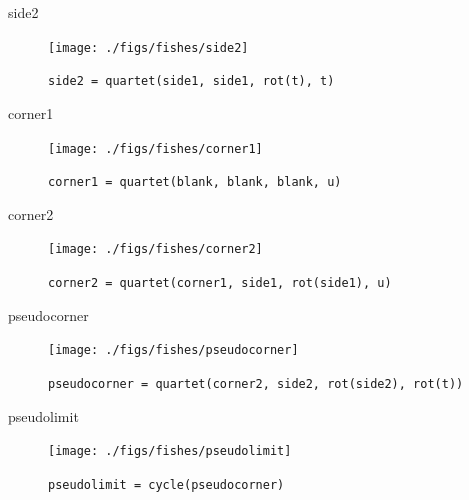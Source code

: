 \documentclass{beamer}
\begin{document}
   \begin{frame}{side2}

        \begin{figure}
            \centering
            \texttt{[image: ./figs/fishes/side2]}
            \caption{\texttt{side2 = quartet(side1, side1, rot(t), t)}}
            \label{fig:side2}
        \end{figure}

    \end{frame}

    \begin{frame}{corner1}

        \begin{figure}
            \centering
            \texttt{[image: ./figs/fishes/corner1]}
            \caption{\texttt{corner1 = quartet(blank, blank, blank, u)}}
            \label{fig:corner1}
        \end{figure}

    \end{frame}

    \begin{frame}{corner2}

        \begin{figure}
            \centering
            \texttt{[image: ./figs/fishes/corner2]}
            \caption{\footnotesize \texttt{corner2 = quartet(corner1, side1, rot(side1), u)}}
            \label{fig:corner2}
        \end{figure}

    \end{frame}

    \begin{frame}{pseudocorner}

        \begin{figure}
            \centering
            \texttt{[image: ./figs/fishes/pseudocorner]}
            \caption{\tiny \texttt{pseudocorner = quartet(corner2, side2, rot(side2), rot(t))}}
            \label{fig:pseudocorner}
        \end{figure}

    \end{frame}

    \begin{frame}{pseudolimit}

        \begin{figure}
            \centering
            \texttt{[image: ./figs/fishes/pseudolimit]}
            \caption{\texttt{pseudolimit = cycle(pseudocorner)}}
            \label{fig:pseudolimit}
        \end{figure}

    \end{frame}
\end{document}
